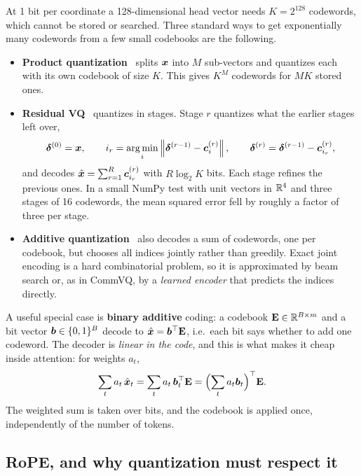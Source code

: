 At 1 bit per coordinate a 128-dimensional head vector needs $K=2^{128}$ codewords, which cannot be
stored or searched. Three standard ways to get exponentially many codewords from a few small codebooks
are the following.
\begin{itemize}
  \item \textbf{Product quantization}~\citep{c13-jegou2011pq} splits $\bm{x}$ into $M$ sub-vectors and
        quantizes each with its own codebook of size $K$. This gives $K^M$ codewords for $MK$ stored ones.
  \item \textbf{Residual VQ}~\citep{c13-gray1984vq} quantizes in stages. Stage $r$ quantizes what the
        earlier stages left over,
        \[
          \bm{\delta}^{(0)}=\bm{x},\qquad i_r=\operatorname*{arg\,min}_i\left\lVert \bm{\delta}^{(r-1)}-\bm{c}^{(r)}_i\right\rVert,\qquad
          \bm{\delta}^{(r)}=\bm{\delta}^{(r-1)}-\bm{c}^{(r)}_{i_r},
        \]
        and decodes $\hat{\bm{x}}=\sum_{r=1}^R\bm{c}^{(r)}_{i_r}$ with $R\log_2K$ bits. Each stage refines
        the previous ones. In a small NumPy test with unit vectors in $\mathbb{R}^4$ and three stages of 16
        codewords, the mean squared error fell by roughly a factor of three per stage.
  \item \textbf{Additive quantization}~\citep{c13-babenko2014aq} also decodes a sum of codewords, one per
        codebook, but chooses all indices jointly rather than greedily. Exact joint encoding is a hard
        combinatorial problem, so it is approximated by beam search or, as in CommVQ, by a \emph{learned
        encoder} that predicts the indices directly.
\end{itemize}
A useful special case is \textbf{binary additive} coding: a codebook $\mathbf{E}\in\mathbb{R}^{B\times m}$ and a
bit vector $\bm{b}\in\{0,1\}^B$ decode to $\hat{\bm{x}}=\bm{b}^{\top}\mathbf{E}$, i.e.\ each bit says whether to add one
codeword. The decoder is \emph{linear in the code}, and this is what makes it cheap inside attention: for
weights $a_t$,
\begin{equation}\label{eq:c13-fold}
  \sum_t a_t\,\hat{\bm{x}}_t = \sum_t a_t\,\bm{b}_t^{\top}\mathbf{E} = \Bigl(\sum_t a_t\bm{b}_t\Bigr)^{\top}\mathbf{E}.
\end{equation}
The weighted sum is taken over bits, and the codebook is applied once, independently of the number of
tokens.

\subsection{RoPE, and why quantization must respect it}\label{sec:c13-rope}

